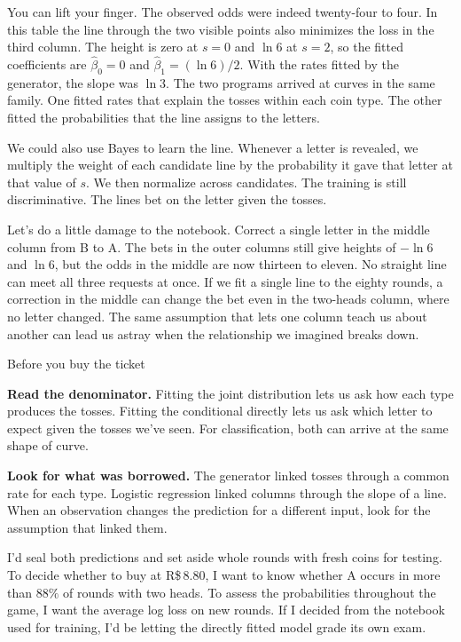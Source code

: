 \documentclass[12pt,oneside]{article}
\newcommand{\itemq}[1]{\par\textbf{#1.}\enspace}
\newcommand{\bookanchor}[1]{\phantomsection\label{#1}}
\begin{document}
You can lift your finger. The observed odds were indeed twenty-four to four. In this table the line through the two visible points also minimizes the loss in the third column. The height is zero at $s=0$ and $\ln 6$ at $s=2$, so the fitted coefficients are $\widehat\beta_0=0$ and $\widehat\beta_1=(\ln 6)/2$. With the rates fitted by the generator, the slope was $\ln 3$. The two programs arrived at curves in the same family. One fitted rates that explain the tosses within each coin type. The other fitted the probabilities that the line assigns to the letters.

We\bookanchor{topic-04-4} could also use Bayes to learn the line. Whenever a letter is revealed, we multiply the weight of each candidate line by the probability it gave that letter at that value of $s$. We then normalize across candidates. The training is still discriminative. The lines bet on the letter given the tosses.

Let's do a little damage to the notebook. Correct a single letter in the middle column from B to A. The bets in the outer columns still give heights of $-\ln 6$ and $\ln 6$, but the odds in the middle are now thirteen to eleven. No straight line can meet all three requests at once. If we fit a single line to the eighty rounds, a correction in the middle can change the bet even in the two-heads column, where no letter changed. The same assumption that lets one column teach us about another can lead us astray when the relationship we imagined breaks down.

\begin{quadro}{Before you buy the ticket}
\itemq{Read the denominator} Fitting the joint distribution lets us ask how each type produces the tosses. Fitting the conditional directly lets us ask which letter to expect given the tosses we've seen. For classification, both can arrive at the same shape of curve.
\itemq{Look for what was borrowed} The generator linked tosses through a common rate for each type. Logistic regression linked columns through the slope of a line. When an observation changes the prediction for a different input, look for the assumption that linked them.
\end{quadro}

I'd seal both predictions and set aside whole rounds with fresh coins for testing. To decide whether to buy at R\$\,8.80, I want to know whether A occurs in more than $88\%$ of rounds with two heads. To assess the probabilities throughout the game, I want the average log loss on new rounds. If I decided from the notebook used for training, I'd be letting the directly fitted model grade its own exam.
\end{document}
